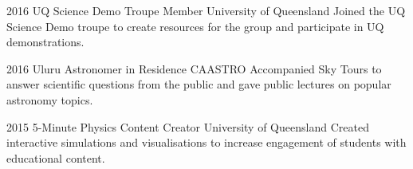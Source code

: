 \documentclass[]{friggeri-cv} %
\begin{document}
\begin{entrylist}
\entry
    {2016}
    {UQ Science Demo Troupe Member}
    {University of Queensland}
    {Joined the UQ Science Demo troupe to create resources for the group and participate in UQ demonstrations.}
\end{entrylist}
\begin{entrylist}
\entry
    {2016}
    {Uluru Astronomer in Residence}
    {CAASTRO}
    {Accompanied Sky Tours to answer scientific questions from the public and gave public lectures on popular astronomy topics.}
\end{entrylist}
\begin{entrylist}
\entry
    {2015}
    {5-Minute Physics Content Creator}
    {University of Queensland}
    {Created interactive simulations and visualisations to increase engagement of students with educational content.}
\end{entrylist}
\end{document}
